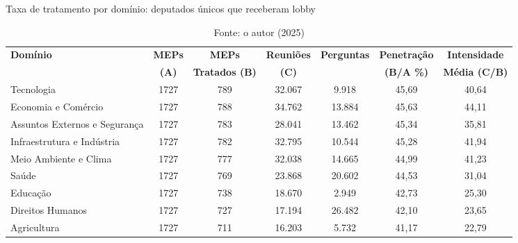 \begin{table}[htbp]
    \centering
    \caption{Taxa de tratamento por domínio: deputados únicos que receberam lobby}
    \label{tab:domain_treatment_rates}
    \begin{tabularx}{\textwidth}{>{\raggedright\arraybackslash}X c c c c c c}
        
        \hline
        \tiny{\textbf{Domínio}} & \tiny{\textbf{MEPs}} & \tiny{\textbf{MEPs}} & \tiny{\textbf{Reuniões}} & \tiny{\textbf{Perguntas}} & \tiny{\textbf{Penetração}} & \tiny{\textbf{Intensidade}} \\
        & \tiny{\textbf{(A)}} & \tiny{\textbf{Tratados (B)}} & \tiny{\textbf{(C)}} & \tiny{\textbf{}} & \tiny{\textbf{(B/A \%)}} & \tiny{\textbf{Média (C/B)}} \\
        \hline 
        \tiny{Tecnologia} & \tiny{1727} & \tiny{789} & \tiny{32.067} & \tiny{9.918} & \tiny{45,69} & \tiny{40,64} \\
        \tiny{Economia e Comércio} & \tiny{1727} & \tiny{788} & \tiny{34.762} & \tiny{13.884} & \tiny{45,63} & \tiny{44,11} \\
        \tiny{Assuntos Externos e Segurança} & \tiny{1727} & \tiny{783} & \tiny{28.041} & \tiny{13.462} & \tiny{45,34} & \tiny{35,81} \\
        \tiny{Infraestrutura e Indústria} & \tiny{1727} & \tiny{782} & \tiny{32.795} & \tiny{10.544} & \tiny{45,28} & \tiny{41,94} \\
        \tiny{Meio Ambiente e Clima} & \tiny{1727} & \tiny{777} & \tiny{32.038} & \tiny{14.665} & \tiny{44,99} & \tiny{41,23} \\
        \tiny{Saúde} & \tiny{1727} & \tiny{769} & \tiny{23.868} & \tiny{20.602} & \tiny{44,53} & \tiny{31,04} \\
        \tiny{Educação} & \tiny{1727} & \tiny{738} & \tiny{18.670} & \tiny{2.949} & \tiny{42,73} & \tiny{25,30} \\
        \tiny{Direitos Humanos} & \tiny{1727} & \tiny{727} & \tiny{17.194} & \tiny{26.482} & \tiny{42,10} & \tiny{23,65} \\
        \tiny{Agricultura} & \tiny{1727} & \tiny{711} & \tiny{16.203} & \tiny{5.732} & \tiny{41,17} & \tiny{22,79} \\
        \hline
        
    \end{tabularx}
    \caption*{Fonte: o autor (2025)}
\end{table}



